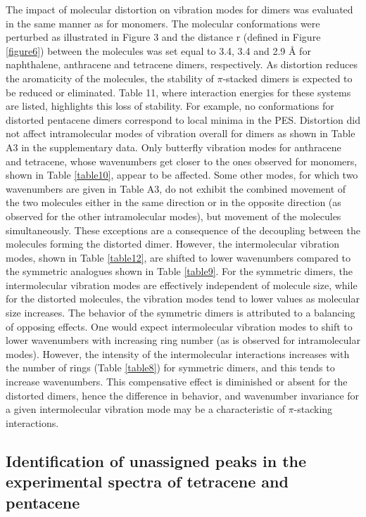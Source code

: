 The impact of molecular distortion on vibration modes for dimers was evaluated in the same manner as for monomers. The molecular conformations were perturbed as illustrated in Figure 3 and the distance r (defined in Figure \ref{figure6}) between the molecules was set equal to 3.4, 3.4 and 2.9 Å for naphthalene, anthracene and tetracene dimers, respectively.  As distortion reduces the aromaticity of the molecules, the stability of $\pi$-stacked dimers is expected to be reduced or eliminated. Table 11, where interaction energies for these systems are listed, highlights this loss of stability. For example, no conformations for distorted pentacene dimers correspond to local minima in the PES. Distortion did not affect intramolecular modes of vibration overall for dimers as shown in Table A3 in the supplementary data. Only butterfly vibration modes for anthracene and tetracene, whose wavenumbers get closer to the ones observed for monomers, shown in Table \ref{table10}, appear to be affected. Some other modes, for which two wavenumbers are given in Table A3, do not exhibit the combined movement of the two molecules either in the same direction or in the opposite direction (as observed for the other intramolecular modes), but movement of the molecules simultaneously. These exceptions are a consequence of the decoupling between the molecules forming the distorted dimer. However, the intermolecular vibration modes, shown in Table \ref{table12}, are shifted to lower wavenumbers compared to the symmetric analogues shown in Table \ref{table9}. For the symmetric dimers, the intermolecular vibration modes are effectively independent of molecule size, while for the distorted molecules, the vibration modes tend to lower values as molecular size increases. 
The behavior of the symmetric dimers is attributed to a balancing of opposing effects. One would expect intermolecular vibration modes to shift to lower wavenumbers with increasing ring number (as is observed for intramolecular modes). However, the intensity of the intermolecular interactions increases with the number of rings (Table \ref{table8}) for symmetric dimers, and this tends to increase wavenumbers. This compensative effect is diminished or absent for the distorted dimers, hence the difference in behavior, and wavenumber invariance for a given intermolecular vibration mode may be a characteristic of $\pi$-stacking interactions. 

\subsection{Identification of unassigned peaks in the experimental spectra of tetracene and pentacene}

